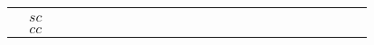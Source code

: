 \documentclass[10pt]{article}
\newcommand{\loq}{{\color[HTML]{006600}{ll}}}
\newcommand{\lon}{{\color[HTML]{800080}{ll}}}
\newcommand{\smn}{{\color[HTML]{800080}{ss}}}
\newcommand{\rcell}{\cellcolor[HTML]{F7CB4A}}
\newcommand{\ocell}{\cellcolor[HTML]{FBAFB5}}
\newcommand{\gcell}{\cellcolor[HTML]{92D2D6}}
\begin{document}
\begin{table}[t]
\begin{adjustbox}{max width=\textwidth}
\begin{tabular}{@{}cc|cc|cc|cc|cc|cc|cc|cc|cc|cc|cc|cc@{}}
        & \ocell\lon&\gcell\smn %
        & \ocell\lon&\gcell\smn %
        & \rcell\lon&\gcell\smn %
        & \rcell\lon&\ocell\smn %
        & \rcell\lon&\ocell\smn %
        \\
        & $sc$ 
        & \ocell\loq&\ocell\smn %
        & \ocell\lon&\ocell\smn %
        & \ocell\lon&\ocell\smn %
        & \ocell\lon&\ocell\smn %
        & \ocell\lon&\gcell\smn %
        & \rcell\lon&\ocell\smn %
        & \rcell\lon&\ocell\smn %
        & \rcell\lon&\ocell\smn %
        & \rcell\lon&\ocell\smn %
        & \rcell\lon&\ocell\smn %
        & \rcell\lon&\ocell\smn %
        \\
        & $cc$ 
        & \ocell\loq&\ocell\smn %
        & \gcell\lon&\ocell\smn %
        & \ocell\lon&\ocell\smn %
        & \ocell\lon&\rcell\smn %
        & \ocell\lon&\rcell\smn %
        & \ocell\lon&\rcell\smn %
        & \rcell\lon&\rcell\smn %
        & \rcell\lon&\rcell\smn %
        & \rcell\lon&\ocell\smn %
        & \rcell\lon&\ocell\smn %
        & \rcell\lon&\rcell\smn %
        \\
        \midrule


\end{tabular}
\end{adjustbox}
\end{table}
\end{document}

